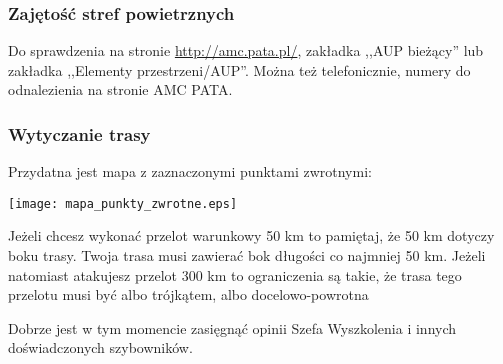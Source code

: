 \documentclass{article}
\begin{document}
\subsubsection{Zajętość stref powietrznych}
Do sprawdzenia na stronie \url{http://amc.pata.pl/}, zakładka
,,AUP bieżący'' lub zakładka ,,Elementy przestrzeni/AUP''. Można też
telefonicznie, numery do odnalezienia na stronie AMC PATA.
\subsubsection{Wytyczanie trasy}
Przydatna jest mapa z zaznaczonymi punktami zwrotnymi:
\begin{center}
\texttt{[image: mapa\_punkty\_zwrotne.eps]}
\end{center}
Jeżeli chcesz wykonać przelot warunkowy 50 km to pamiętaj, że 50 km dotyczy
boku trasy. Twoja trasa musi zawierać bok długości co najmniej 50 km.
Jeżeli natomiast atakujesz przelot 300 km to ograniczenia są takie, że
trasa tego przelotu musi być albo trójkątem, albo docelowo-powrotna

Dobrze jest w tym momencie zasięgnąć opinii Szefa Wyszkolenia i innych
doświadczonych szybowników.

\newpage
\end{document}
